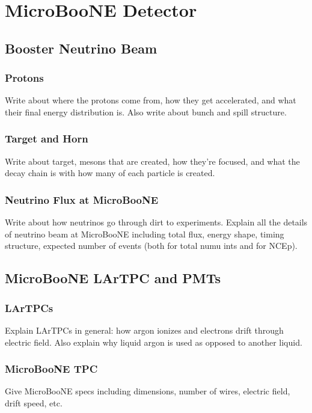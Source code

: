 \section{MicroBooNE Detector}\label{microboone}

\subsection{Booster Neutrino Beam}\label{beam}
  \subsubsection{Protons}
    Write about where the protons come from, how they get accelerated, and what their final energy distribution is. Also write about bunch and spill structure.
  \subsubsection{Target and Horn}
    Write about target, mesons that are created, how they're focused, and what the decay chain is with how many of each particle is created. 
  \subsubsection{Neutrino Flux at MicroBooNE}
    Write about how neutrinos go through dirt to experiments. Explain all the details of neutrino beam at MicroBooNE including total flux, energy shape, timing structure, expected number of events (both for total numu ints and for NCEp).
 
\subsection{MicroBooNE LArTPC and PMTs}\label{tpc}
  \subsubsection{LArTPCs}
    Explain LArTPCs in general: how argon ionizes and electrons drift through electric field. Also explain why liquid argon is used as opposed to another liquid.
  \subsubsection{MicroBooNE TPC}
    Give MicroBooNE specs including dimensions, number of wires, electric field, drift speed, etc.
